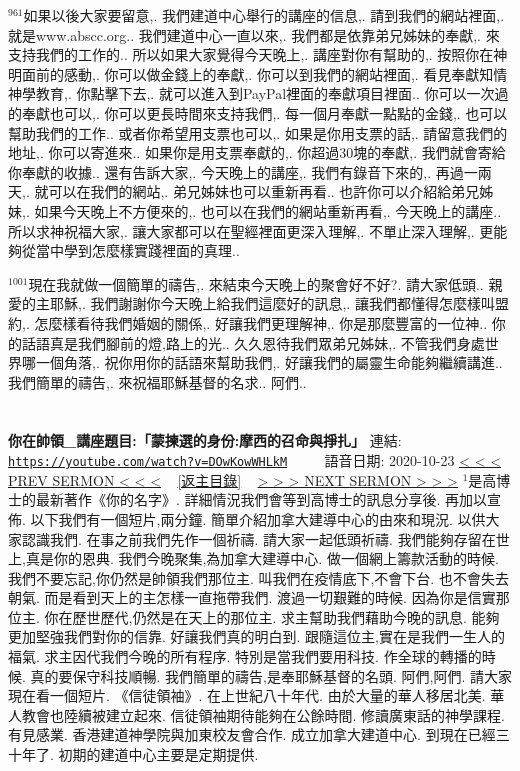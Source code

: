 \documentclass{book}
\begin{document}
$^{961}$如果以後大家要留意,.
我們建道中心舉行的講座的信息,.
請到我們的網站裡面,.
就是www.abscc.org..
我們建道中心一直以來,.
我們都是依靠弟兄姊妹的奉獻,.
來支持我們的工作的..
所以如果大家覺得今天晚上,.
講座對你有幫助的,.
按照你在神明面前的感動,.
你可以做金錢上的奉獻,.
你可以到我們的網站裡面,.
看見奉獻知情神學教育,.
你點擊下去,.
就可以進入到PayPal裡面的奉獻項目裡面..
你可以一次過的奉獻也可以,.
你可以更長時間來支持我們,.
每一個月奉獻一點點的金錢,.
也可以幫助我們的工作..
或者你希望用支票也可以,.
如果是你用支票的話,.
請留意我們的地址,.
你可以寄進來..
如果你是用支票奉獻的,.
你超過30塊的奉獻,.
我們就會寄給你奉獻的收據..
還有告訴大家,.
今天晚上的講座,.
我們有錄音下來的,.
再過一兩天,.
就可以在我們的網站,.
弟兄姊妹也可以重新再看..
也許你可以介紹給弟兄姊妹,.
如果今天晚上不方便來的,.
也可以在我們的網站重新再看,.
今天晚上的講座..
所以求神祝福大家,.
讓大家都可以在聖經裡面更深入理解,.
不單止深入理解,.
更能夠從當中學到怎麼樣實踐裡面的真理..

$^{1001}$現在我就做一個簡單的禱告,.
來結束今天晚上的聚會好不好?.
請大家低頭..
親愛的主耶穌,.
我們謝謝你今天晚上給我們這麼好的訊息,.
讓我們都懂得怎麼樣叫盟約,.
怎麼樣看待我們婚姻的關係,.
好讓我們更理解神,.
你是那麼豐富的一位神..
你的話語真是我們腳前的燈,路上的光..
久久恩待我們眾弟兄姊妹,.
不管我們身處世界哪一個角落,.
祝你用你的話語來幫助我們,.
好讓我們的屬靈生命能夠繼續講進..
我們簡單的禱告,.
來祝福耶穌基督的名求..
阿們..
\newpage



\section{}
\label{sec:DOwKowWHLkM}
\textbf{你在帥領\_講座題目:「蒙揀選的身份:摩西的召命與掙扎」}
\newline
\newline
連結: \href{https://youtube.com/watch?v=DOwKowWHLkM}{\texttt{https://youtube.com/watch?v=DOwKowWHLkM}} ~~~~ 語音日期: 2020-10-23
\newline
\newline
\hyperref[sec:n5DpA1Db_0M]{\small{< < < PREV SERMON < < <}}
~
\hyperref[sec:index]{\small{[返主目錄]}}
~
\hyperref[sec:0]{\small{> > > NEXT SERMON > > >}}
\newline
\newline
$^{1}$是高博士的最新著作《你的名字》.
詳細情況我們會等到高博士的訊息分享後.
再加以宣佈.
以下我們有一個短片,兩分鐘.
簡單介紹加拿大建導中心的由來和現況.
以供大家認識我們.
在事之前我們先作一個祈禱.
請大家一起低頭祈禱.
我們能夠存留在世上,真是你的恩典.
我們今晚聚集,為加拿大建導中心.
做一個網上籌款活動的時候.
我們不要忘記,你仍然是帥領我們那位主.
叫我們在疫情底下,不會下台.
也不會失去朝氣.
而是看到天上的主怎樣一直拖帶我們.
渡過一切艱難的時候.
因為你是信實那位主.
你在歷世歷代,仍然是在天上的那位主.
求主幫助我們藉助今晚的訊息.
能夠更加堅強我們對你的信靠.
好讓我們真的明白到.
跟隨這位主,實在是我們一生人的福氣.
求主因代我們今晚的所有程序.
特別是當我們要用科技.
作全球的轉播的時候.
真的要保守科技順暢.
我們簡單的禱告,是奉耶穌基督的名頭.
阿們,阿們.
請大家現在看一個短片.
《信徒領袖》.
在上世紀八十年代.
由於大量的華人移居北美.
華人教會也陸續被建立起來.
信徒領袖期待能夠在公餘時間.
修讀廣東話的神學課程.
有見感業.
香港建道神學院與加東校友會合作.
成立加拿大建道中心.
到現在已經三十年了.
初期的建道中心主要是定期提供.
\end{document}
